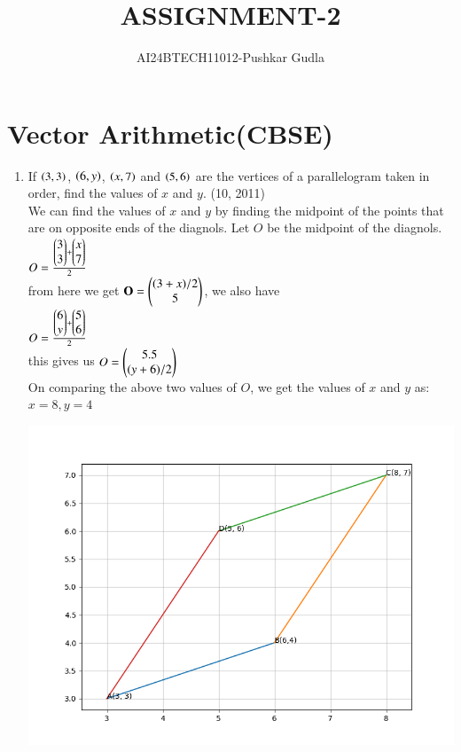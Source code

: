 \documentclass[journal,12pt,twocolumn]{IEEEtran}
\theoremstyle{remark}
\begin{document}

\vspace{3cm}

\title{ASSIGNMENT-2}
\author{AI24BTECH11012-Pushkar Gudla}
\maketitle
\newpage
\bigskip
\section*{\textbf{Vector Arithmetic(CBSE)}}
\begin{enumerate}
	\item If $\left(3,3\right)$, $\left(6,y\right)$, $\left(x,7\right)$ and $\left(5,6\right)$ are the vertices of a parallelogram taken in order, find the values of $x$ and $y$. 
		\hfill{(10, 2011)}\\

		\solution We can find the values of $x$ and $y$ by finding the midpoint of the points that are on opposite ends of the diagnols. Let $O$ be the midpoint of the diagnols.\\

		$O=\frac{\begin{pmatrix}3\\3\end{pmatrix}+\begin{pmatrix}x\\7\end{pmatrix}}{2}$\\
		from here we get $\mathbf{O}=\begin{pmatrix}(3+x)/2 \\ 5\end{pmatrix}$, we also have\\
		$O=\frac{\begin{pmatrix}6\\y\end{pmatrix}+\begin{pmatrix}5\\6\end{pmatrix}}{2}$\\
		this gives us $O=\begin{pmatrix}5.5\\(y+6)/2\end{pmatrix}$\\
		On comparing the above two values of $O$, we get the values of $x$ and $y$ as:\\
		$x=8, y=4$\\
\graphicspath{ {./figs/} }
		\includegraphics[scale=0.4]{parallelogram}
\end{enumerate}
\end{document}
